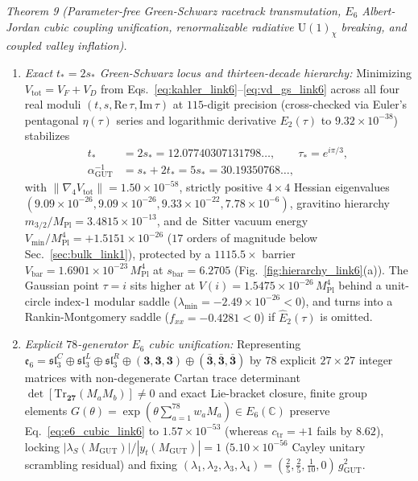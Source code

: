 \documentclass[aps,prd,twocolumn,nofootinbib,floatfix]{revtex4-2}
\begin{document}
\emph{Theorem 9 (Parameter-free Green-Schwarz racetrack transmutation, $E_6$ Albert-Jordan cubic coupling unification, renormalizable radiative $\mathrm{U}(1)_\chi$ breaking, and coupled valley inflation).}
\begin{enumerate}
    \item \emph{Exact $t_* = 2s_*$ Green-Schwarz locus and thirteen-decade hierarchy:} Minimizing $V_{\mathrm{tot}} = V_F + V_D$ from Eqs.~\eqref{eq:kahler_link6}--\eqref{eq:vd_gs_link6} across all four real moduli $(t, s, \mathrm{Re}\,\tau, \mathrm{Im}\,\tau)$ at $115$-digit precision (cross-checked via Euler's pentagonal $\eta(\tau)$ series and logarithmic derivative $E_2(\tau)$ to $9.32\times 10^{-38}$) stabilizes
    \begin{align}
    \label{eq:link6_vacuum}
    t_* &= 2s_* = 12.07740307131798\dots, \qquad \tau_* = e^{i\pi/3}, \nonumber\\
    \alpha_{\mathrm{GUT}}^{-1} &= s_* + 2t_* = 5s_* = 30.19350768\dots,
    \end{align}
    with $\|\nabla_4 V_{\mathrm{tot}}\| = 1.50\times 10^{-58}$, strictly positive $4\times 4$ Hessian eigenvalues $(9.09\times 10^{-26}, 9.09\times 10^{-26}, 9.33\times 10^{-22}, 7.78\times 10^{-6})$, gravitino hierarchy $m_{3/2}/M_{\mathrm{Pl}} = 3.4815\times 10^{-13}$, and de~Sitter vacuum energy $V_{\min}/M_{\mathrm{Pl}}^4 = +1.5151\times 10^{-26}$ ($17$ orders of magnitude below Sec.~\ref{sec:bulk_link1}), protected by a $1115.5\times$ barrier $V_{\mathrm{bar}} = 1.6901\times 10^{-23}\,M_{\mathrm{Pl}}^4$ at $s_{\mathrm{bar}} = 6.2705$ (Fig.~\ref{fig:hierarchy_link6}(a)). The Gaussian point $\tau = i$ sits higher at $V(i) = 1.5475\times 10^{-26}\,M_{\mathrm{Pl}}^4$ behind a unit-circle index-$1$ modular saddle ($\lambda_{\min} = -2.49\times 10^{-26} < 0$), and turns into a Rankin-Montgomery saddle ($f_{xx} = -0.4281 < 0$) if $\widehat{E}_2(\tau)$ is omitted.
    \item \emph{Explicit $78$-generator $E_6$ cubic unification:} Representing $\mathfrak{e}_6 = \mathfrak{sl}_3^C \oplus \mathfrak{sl}_3^L \oplus \mathfrak{sl}_3^R \oplus (\mathbf{3},\mathbf{3},\mathbf{3}) \oplus (\bar{\mathbf{3}},\bar{\mathbf{3}},\bar{\mathbf{3}})$ by $78$ explicit $27\times 27$ integer matrices with non-degenerate Cartan trace determinant $\det[\mathrm{Tr}_{\mathbf{27}}(M_a M_b)] \ne 0$ and exact Lie-bracket closure, finite group elements $G(\theta) = \exp(\theta\sum_{a=1}^{78} w_a M_a) \in E_6(\mathbb{C})$ preserve Eq.~\eqref{eq:e6_cubic_link6} to $1.57\times 10^{-53}$ (whereas $c_{\mathrm{tr}} = +1$ fails by $8.62$), locking $|\lambda_S(M_{\mathrm{GUT}})|/|y_t(M_{\mathrm{GUT}})| = 1$ ($5.10\times 10^{-56}$ Cayley unitary scrambling residual) and fixing $(\lambda_1,\lambda_2,\lambda_3,\lambda_4) = (\frac{2}{5},\frac{2}{5},\frac{1}{10},0)\,g_{\mathrm{GUT}}^2$.

\end{enumerate}
\end{document}
